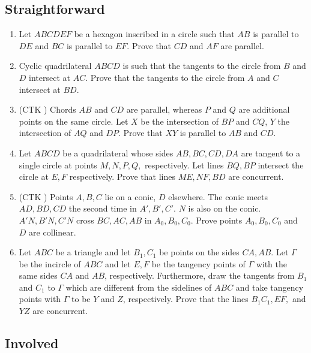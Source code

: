 \documentclass[11pt,paper=letter]{scrartcl}
\begin{document}
\subsection{Straightforward}

\begin{enumerate}

\item Let $ABCDEF$ be a hexagon inscribed in a circle such that $AB$ is parallel to $DE$ and $BC$ is parallel to $EF$. Prove that $CD$ and $AF$ are parallel.

\item Cyclic quadrilateral $ABCD$ is such that the tangents to the circle from $B$ and $D$ intersect at $AC$. Prove that the tangents to the circle from $A$ and $C$ intersect at $BD$.

\item (CTK \cite{CTK4}) Chords $AB$ and $CD$ are parallel, whereas $P$ and $Q$ are additional points on the same circle. Let $X$ be the intersection of $BP$ and $CQ$, $Y$ the intersection of $AQ$ and $DP$. Prove that $XY$ is parallel to $AB$ and $CD$.

\item Let $ABCD$ be a quadrilateral whose sides $AB, BC, CD, DA$ are tangent to a single circle at points $M, N, P, Q,$ respectively. Let lines $BQ, BP$ intersect the circle at $E, F$ respectively. Prove that lines $ME, NF, BD$ are concurrent.

\item (CTK \cite{CTK8}) Points $A,B,C$ lie on a conic, $D$ elsewhere. The conic meets $AD, BD, CD$ the second time in $A', B', C'$. $N$ is also on the conic. $A'N, B'N, C'N$ cross $BC, AC, AB$ in $A_0, B_0, C_0$. Prove points $A_0, B_0, C_0$ and $D$ are collinear.

\item Let $ABC$ be a triangle and let $B_1, C_1$ be points on the sides $CA, AB$. Let $\Gamma$ be the incircle of $ABC$ and let $E, F$ be the tangency points of $\Gamma$ with the same sides $CA$ and $AB$, respectively. Furthermore, draw the tangents from $B_1$ and $C_1$ to $\Gamma$ which are different from the sidelines of $ABC$ and take tangency points with $\Gamma$ to be $Y$ and $Z$, respectively. Prove that the lines $B_1C_1, EF,$ and $YZ$ are concurrent.

\end{enumerate}

\subsection{Involved}
\end{document}

